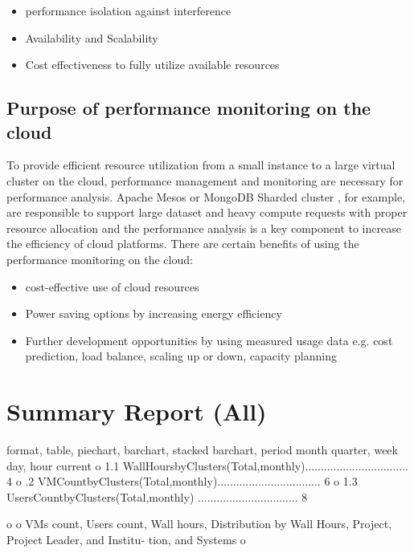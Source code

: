 \documentclass{sig-alternate-05-2015}
\begin{document}
\begin{itemize}
\item performance isolation against interference
\item Availability and Scalability
\item Cost effectiveness to fully utilize available resources
\end{itemize}

\subsection{Purpose of performance monitoring on the cloud}

To provide efficient resource utilization from a small instance to a large
virtual cluster on the cloud, performance management and monitoring are
necessary for performance analysis. Apache Mesos or MongoDB Sharded cluster ,
for example, are responsible to support large dataset and heavy compute
requests with proper resource allocation and the performance analysis is a key
component to increase the efficiency of cloud platforms. There are certain
benefits of using the performance monitoring on the cloud:
\begin{itemize}
\item cost-effective use of cloud resources
\item Power saving options by increasing energy efficiency
\item Further development opportunities by using measured usage data e.g. cost
      prediction, load balance, scaling up or down, capacity planning
\end{itemize}





\section{Summary Report (All)}
                                                                                                        format, table, piechart, barchart, stacked barchart, period month quarter, week day, hour current                                       
o       1.1  WallHoursbyClusters(Total,monthly)................................. 4                              
o       .2  VMCountbyClusters(Total,monthly)................................. 6
o       1.3  UsersCountbyClusters(Total,monthly) ................................ 8 

o       
o       VMs count, Users count, Wall hours, Distribution by Wall Hours, Project, Project Leader, and Institu- tion, and Systems 
o                                               
\end{document}
